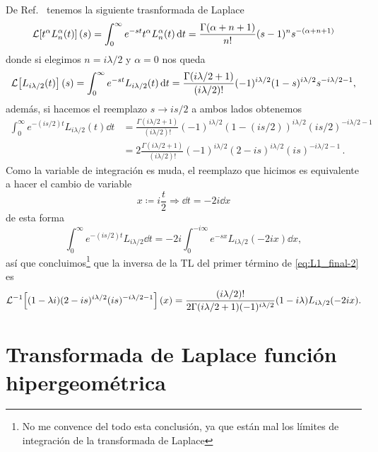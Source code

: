 \documentclass[%
 aip,
 jmp,%
 amsmath,amssymb,
 reprint,%
]{revtex4-2}
\begin{document}
{De Ref.~ tenemos la siguiente trasnformada de Laplace
\begin{equation}
\mathcal{L}\qty[t^\alpha L_n^\alpha(t)](s)=\int_0^{\infty}e^{-st}t^\alpha L_n^\alpha(t)\dd{t}=\frac{\Gamma(\alpha+n+1)}{n!}(s-1)^ns^{-(\alpha+n+1)}
\end{equation}
donde si elegimos $n=i\lambda/2$ y $\alpha=0$ nos queda
\begin{equation}
    \mathcal{L}\qty[L_{i\lambda/2}(t)](s)=\int_0^\infty e^{-st}L_{i\lambda/2}(t)\dd{t}=\frac{\Gamma(i\lambda/2+1)}{(i\lambda/2)!}(-1)^{i\lambda/2}(1-s)^{i\lambda/2}s^{-i\lambda/2-1},
\end{equation}
además, si hacemos el reemplazo $s\to is/2$ a ambos lados obtenemos
\begin{equation}
\begin{aligned}
    \int_0^\infty e^{-(is/2)t}L_{i\lambda/2}(t)\dd{t}&=\frac{\Gamma(i\lambda/2+1)}{(i\lambda/2)!}(-1)^{i\lambda/2}(1-(is/2))^{i\lambda/2}(is/2)^{-i\lambda/2-1}\\
    &=2\frac{\Gamma(i\lambda/2+1)}{(i\lambda/2)!}(-1)^{i\lambda/2}(2-is)^{i\lambda/2}(is)^{-i\lambda/2-1}\,.
\end{aligned}
\end{equation}
Como la variable de integración es muda, el reemplazo que hicimos es equivalente a hacer el cambio de variable
\begin{equation}
    x\coloneq i\frac{t}{2} \Rightarrow \dd{t}=-2i\dd{x}
\end{equation}
de esta forma
\begin{equation}
    \int_0^\infty e^{-(is/2)t}L_{i\lambda/2}\dd{t}=-2i\int_0^{-i\infty}e^{-sx}L_{i\lambda/2}(-2ix)\dd{x},
\end{equation}
así que concluimos\footnote{No me convence del todo esta conclusión, ya que están mal los límites de integración de la transformada de Laplace} que la inversa de la TL del primer término de \eqref{eq:L1_final-2} es
\begin{equation}
    \mathcal{L}^{-1}\qty[(1-\lambda i)(2-is)^{i\lambda/2}(is)^{-i\lambda/2-1}](x)=\frac{(i\lambda/2)!}{2\Gamma(i\lambda/2+1)(-1)^{i\lambda/2}}(1-i\lambda)L_{i\lambda/2}(-2ix).
\end{equation}

\section{Transformada de Laplace función hipergeométrica}

}
\end{document}
